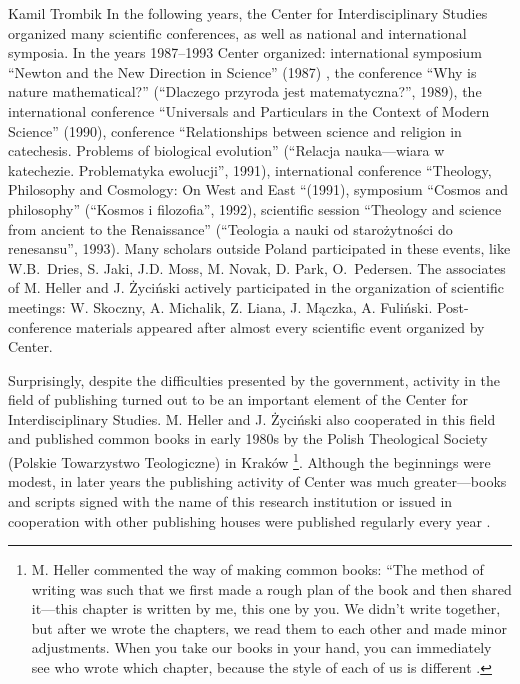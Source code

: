 \begin{artengenv}{Kamil Trombik}
In the following years, the Center for Interdisciplinary Studies organized many scientific conferences, as well as
national and international symposia. In the years 1987--1993 Center organized: international symposium ``Newton and the
New Direction in Science'' (1987) , the conference ``Why is nature mathematical?'' (``Dlaczego przyroda jest
matematyczna?'', 1989), the international conference ``Universals and Particulars in the Context of Modern Science''
(1990), conference ``Relationships between science and religion in catechesis. Problems of biological evolution''
(``Relacja nauka---wiara w katechezie. Problematyka ewolucji'', 1991), international conference ``Theology, Philosophy and
Cosmology: On West and East ``(1991), symposium ``Cosmos and philosophy'' (``Kosmos i filozofia'', 1992), scientific session
``Theology and science from ancient to the Renaissance'' (``Teologia a nauki od starożytności do renesansu'', 1993). Many
scholars outside Poland participated in these events, like W.B.~Dries, S. Jaki, J.D. Moss, M. Novak, D. Park,
O.~Pedersen. The associates of M. Heller and J. Życiński actively participated in the organization of scientific meetings:
W. Skoczny, A. Michalik, Z. Liana, J. Mączka, A. Fuliński. Post-conference materials appeared after almost every
scientific event organized by Center.

Surprisingly, despite the difficulties presented by the government, activity in the field of publishing turned out to be
an important element of the Center for Interdisciplinary Studies. M. Heller and J. Życiński also cooperated in this
field and published common books in early 1980s by the Polish Theological Society (Polskie Towarzystwo Teologiczne) in
Kraków
\parencites{heller_wszechswiat_1980,heller_drogi_1983}\footnote{%
M. Heller commented the way of making
common books: ``The method of writing was such that we first made a rough plan of the book and then shared it---this
chapter is written by me, this one by you. We didn't write together, but after we wrote the chapters, we read them to
each other and made minor adjustments. When you take our books in your hand, you can immediately see who wrote which
chapter, because the style of each of us is different
\parencite[p.231]{heller_wierze_2016}.
}. Although
the beginnings were modest, in later years the publishing activity of Center was much greater---books and scripts signed
with the name of this research institution or issued in cooperation with other publishing houses were published
regularly every year
\parencite[e.g.][]{heller_filozofowac_1987,coyne_newton_1988,heller_matematycznosc_1990,%
	mcmullin_ewolucja_1990,heller_spor_1991,wolak_neotomizm_1993}.


\end{artengenv}
